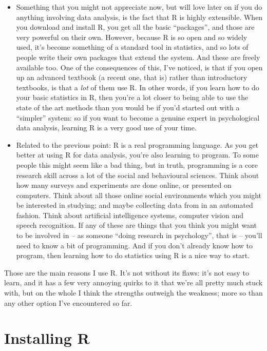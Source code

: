 \documentclass[
]{book}
\begin{document}
\begin{itemize}
\item
  Something that you might not appreciate now, but will love later on if you do anything involving data analysis, is the fact that R is highly extensible. When you download and install R, you get all the basic ``packages'', and those are very powerful on their own. However, because R is so open and so widely used, it's become something of a standard tool in statistics, and so lots of people write their own packages that extend the system. And these are freely available too. One of the consequences of this, I've noticed, is that if you open up an advanced textbook (a recent one, that is) rather than introductory textbooks, is that a \emph{lot} of them use R. In other words, if you learn how to do your basic statistics in R, then you're a lot closer to being able to use the state of the art methods than you would be if you'd started out with a ``simpler'' system: so if you want to become a genuine expert in psychological data analysis, learning R is a very good use of your time.
\item
  Related to the previous point: R is a real programming language. As you get better at using R for data analysis, you're also learning to program. To some people this might seem like a bad thing, but in truth, programming is a core research skill across a lot of the social and behavioural sciences. Think about how many surveys and experiments are done online, or presented on computers. Think about all those online social environments which you might be interested in studying; and maybe collecting data from in an automated fashion. Think about artificial intelligence systems, computer vision and speech recognition. If any of these are things that you think you might want to be involved in -- as someone ``doing research in psychology'', that is -- you'll need to know a bit of programming. And if you don't already know how to program, then learning how to do statistics using R is a nice way to start.
\end{itemize}

Those are the main reasons I use R. It's not without its flaws: it's not easy to learn, and it has a few very annoying quirks to it that we're all pretty much stuck with, but on the whole I think the strengths outweigh the weakness; more so than any other option I've encountered so far.

\hypertarget{gettingR}{%
\section{Installing R}\label{gettingR}}
\end{document}
